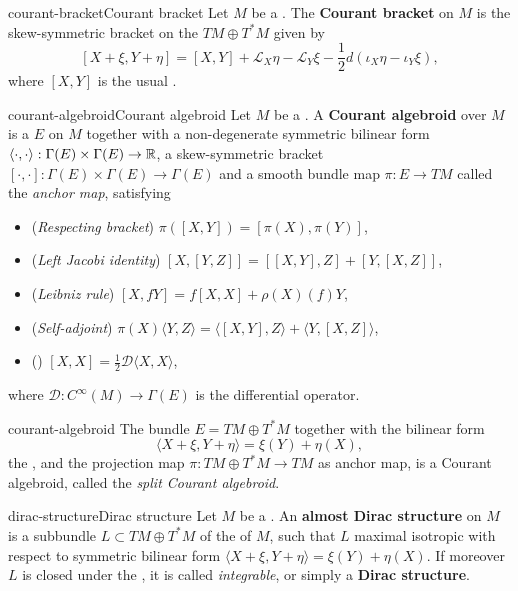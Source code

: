 \begin{topic}{courant-bracket}{Courant bracket}
    Let $M$ be a . The \textbf{Courant bracket} on $M$ is the skew-symmetric bracket on the  $TM \oplus T^*M$ given by
    \[ [X + \xi, Y + \eta] = [X, Y] + \mathcal{L}_X \eta - \mathcal{L}_Y \xi - \frac{1}{2} d \left(\iota_X \eta - \iota_Y \xi \right) , \]
    where $[X, Y]$ is the usual .
\end{topic}

\begin{topic}{courant-algebroid}{Courant algebroid}
    Let $M$ be a . A \textbf{Courant algebroid} over $M$ is a  $E$ on $M$ together with a non-degenerate symmetric bilinear form $\langle \cdot, \cdot \rangle : \Gamma(E) \times \Gamma(E) \to \mathbb{R}$, a skew-symmetric bracket $[\cdot, \cdot] : \Gamma(E) \times \Gamma(E) \to \Gamma(E)$ and a smooth bundle map $\pi : E \to TM$ called the \textit{anchor map}, satisfying
    \begin{itemize}
        \item (\textit{Respecting bracket}) $\pi([X, Y]) = [\pi(X), \pi(Y)]$,
        \item (\textit{Left Jacobi identity}) $[X, [Y, Z]] = [[X, Y], Z] + [Y, [X, Z]]$,
        \item (\textit{Leibniz rule}) $[X, fY] = f[X, X] + \rho(X)(f) Y$,
        \item (\textit{Self-adjoint}) $\pi(X) \langle Y, Z \rangle = \langle [X, Y], Z \rangle + \langle Y, [X, Z] \rangle$,
        \item (\textit{}) $[X, X] = \frac{1}{2} \mathcal{D} \langle X, X \rangle$,
    \end{itemize}
    where $\mathcal{D} : C^\infty(M) \to \Gamma(E)$ is the differential operator.
\end{topic}

\begin{example}{courant-algebroid}
    The bundle $E = TM \oplus T^*M$ together with the bilinear form
    \[ \langle X + \xi, Y + \eta \rangle = \xi(Y) + \eta(X) , \]
    the , and the projection map $\pi : TM \oplus T^*M \to TM$ as anchor map, is a Courant algebroid, called the \textit{split Courant algebroid}.
\end{example}

\begin{topic}{dirac-structure}{Dirac structure}
    Let $M$ be a . An \textbf{almost Dirac structure} on $M$ is a subbundle $L \subset TM \oplus T^*M$ of the  of $M$, such that $L$ maximal isotropic with respect to symmetric bilinear form $\langle X + \xi, Y + \eta \rangle = \xi(Y) + \eta(X)$. If moreover $L$ is closed under the , it is called \textit{integrable}, or simply a \textbf{Dirac structure}.
\end{topic}


